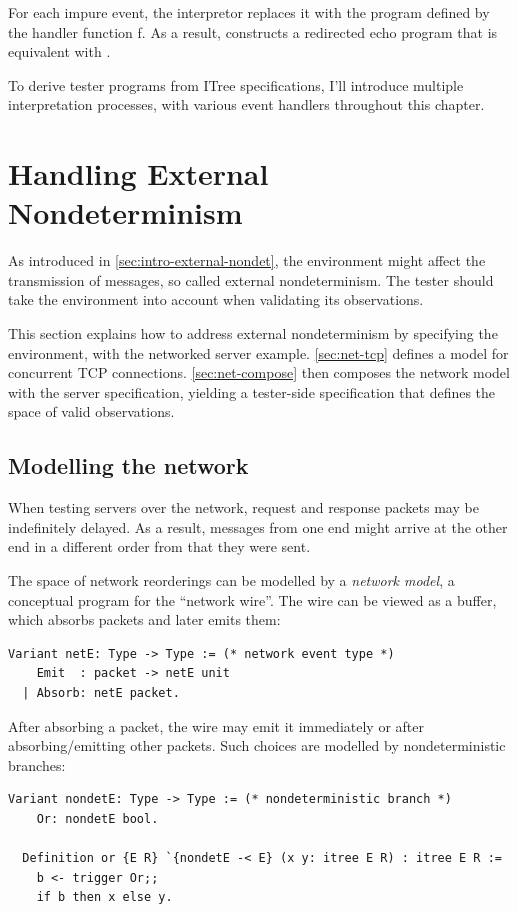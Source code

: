 For each impure event, the interpretor replaces it with the program defined by
the handler function \ilc f.  As a result,  constructs a
redirected echo program that is equivalent with .

To derive tester programs from ITree specifications, I'll introduce multiple
interpretation processes, with various event handlers throughout this chapter.

\section{Handling External Nondeterminism}
\label{sec:external-nondet}
As introduced in \autoref{sec:intro-external-nondet}, the environment might
affect the transmission of messages, so called external nondeterminism.  The
tester should take the environment into account when validating its
observations.

This section explains how to address external nondeterminism by specifying the
environment, with the networked server example.  \autoref{sec:net-tcp} defines a
model for concurrent TCP connections.  \autoref{sec:net-compose} then composes
the network model with the server specification, yielding a tester-side
specification that defines the space of valid observations.

\subsection{Modelling the network}
\label{sec:net-tcp}
When testing servers over the network, request and response packets may be
indefinitely delayed.  As a result, messages from one end might arrive at the
other end in a different order from that they were sent.

The space of network reorderings can be modelled by a {\em network model}, a
conceptual program for the ``network wire''.  The wire can be viewed as a
buffer, which absorbs packets and later emits them:
\begin{lstlisting}[style=customcoq]
  Variant netE: Type -> Type := (* network event type *)
    Emit  : packet -> netE unit
  | Absorb: netE packet.
\end{lstlisting}

After absorbing a packet, the wire may emit it immediately or after
absorbing/emitting other packets.  Such choices are modelled by nondeterministic
 branches:
\begin{lstlisting}[style=customcoq]
  Variant nondetE: Type -> Type := (* nondeterministic branch *)
    Or: nondetE bool.

  Definition or {E R} `{nondetE -< E} (x y: itree E R) : itree E R :=
    b <- trigger Or;;
    if b then x else y.
\end{lstlisting}

